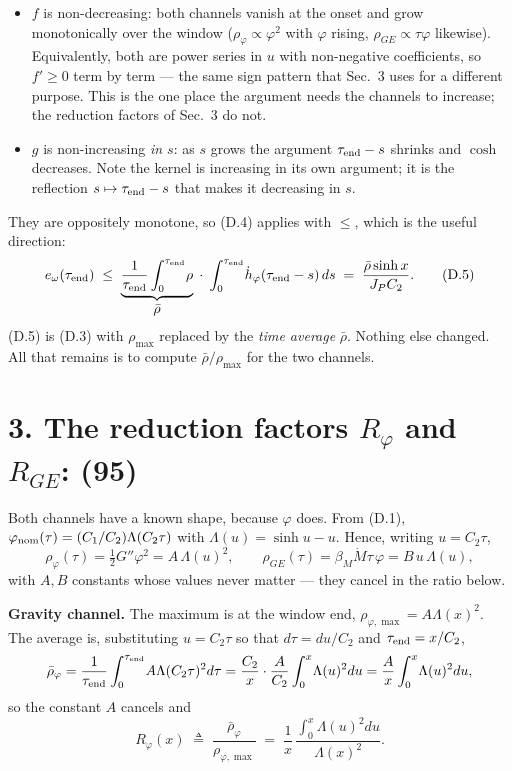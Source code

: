 \documentclass[11pt]{article}
\newcommand{\te}{\tau_{\rm end}}
\newcommand{\rmax}{\rho_{\max}}
\newcommand{\rbar}{\bar\rho}
\begin{document}
\begin{itemize}
\item $f$ is non-decreasing: both channels vanish at the onset and
  grow monotonically over the window ($\rho_\varphi\propto\varphi^2$
  with $\varphi$ rising, $\rho_{GE}\propto\tau\varphi$ likewise).
  Equivalently, both are power series in $u$ with non-negative
  coefficients, so $f'\ge0$ term by term --- the same sign pattern that
  Sec.~3 uses for a different purpose. This is the one place the
  argument needs the channels to increase; the reduction factors of
  Sec.~3 do not.
\item $g$ is non-increasing \emph{in $s$}: as $s$ grows the argument
  $\te-s$ shrinks and $\cosh$ decreases. Note the kernel is increasing
  in its own argument; it is the reflection $s\mapsto\te-s$ that makes
  it decreasing in $s$.
\end{itemize}

They are oppositely monotone, so (D.4) applies with $\le$, which is the
useful direction:
\begin{equation}
  e_\omega(\te)
  \;\le\; \underbrace{\frac{1}{\te}\int_0^{\te}\!\rho}_{\textstyle\rbar}
  \;\cdot\;\int_0^{\te}\!\dot h_\varphi(\te-s)\,ds
  \;=\; \frac{\rbar\sinh x}{J_PC_2}.
  \tag{D.5}
\end{equation}
(D.5) is (D.3) with $\rmax$ replaced by the \emph{time average} $\rbar$.
Nothing else changed. All that remains is to compute $\rbar/\rmax$ for
the two channels.

\section*{3. The reduction factors $R_\varphi$ and $R_{GE}$: (95)}

Both channels have a known shape, because $\varphi$ does. From (D.1),
$\varphi_{\rm nom}(\tau) = (C_1/C_2)\Lambda(C_2\tau)$ with
$\Lambda(u) = \sinh u - u$. Hence, writing $u = C_2\tau$,
\[
  \rho_\varphi(\tau) = \tfrac12 G''\varphi^2 = A\,\Lambda(u)^2,
  \qquad
  \rho_{GE}(\tau) = \beta_M\dot M\tau\,\varphi = B\,u\,\Lambda(u),
\]
with $A,B$ constants whose values never matter --- they cancel in the
ratio below.

\textbf{Gravity channel.} The maximum is at the window end,
$\rho_{\varphi,\max} = A\Lambda(x)^2$. The average is, substituting
$u = C_2\tau$ so that $d\tau = du/C_2$ and $\te = x/C_2$,
\[
  \bar\rho_\varphi = \frac{1}{\te}\int_0^{\te}\! A\Lambda(C_2\tau)^2 d\tau
  = \frac{C_2}{x}\cdot\frac{A}{C_2}\int_0^x\!\Lambda(u)^2 du
  = \frac{A}{x}\int_0^x\!\Lambda(u)^2 du ,
\]
so the constant $A$ cancels and
\begin{equation}
  R_\varphi(x) \;\triangleq\;
  \frac{\bar\rho_\varphi}{\rho_{\varphi,\max}}
  \;=\; \frac{1}{x}\,\frac{\int_0^x\Lambda(u)^2du}{\Lambda(x)^2}.
  \tag{D.6}
\end{equation}
\end{document}
